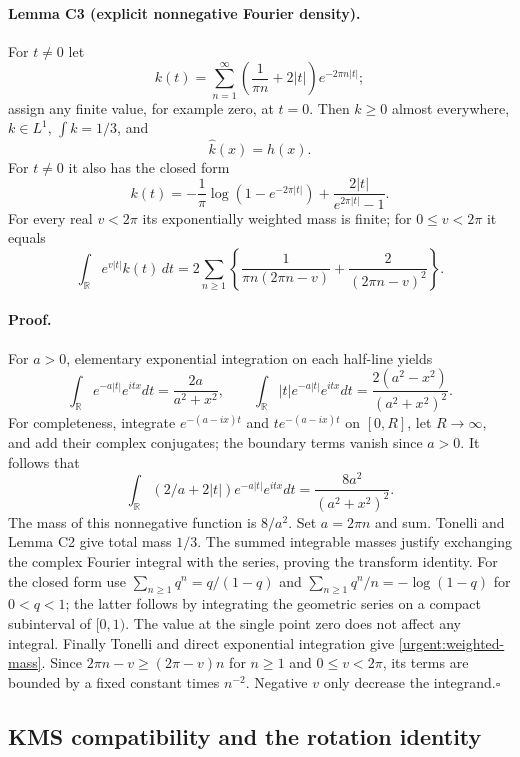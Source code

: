 \paragraph{Lemma C3 (explicit nonnegative Fourier density).}
For $t\ne0$ let
\[
 k(t)=\sum_{n=1}^\infty
       \left(\frac1{\pi n}+2|t|\right)e^{-2\pi n|t|};
\]
assign any finite value, for example zero, at $t=0$. Then $k\geq0$
almost everywhere, $k\in L^1$, $\int k=1/3$, and
\[
 \widehat k(x)=h(x).
\]
For $t\ne0$ it also has the closed form
\[
 k(t)=-\frac1\pi\log(1-e^{-2\pi|t|})
              +\frac{2|t|}{e^{2\pi|t|}-1}.
\]
For every real $v<2\pi$ its exponentially weighted mass is finite;
for $0\leq v<2\pi$ it equals
\begin{equation}
 \int_{\mathbb R}e^{v|t|}k(t)\,dt
 =2\sum_{n\geq1}\left\{
 \frac1{\pi n(2\pi n-v)}+
 \frac2{(2\pi n-v)^2}\right\}.
 \label{urgent:weighted-mass}
\end{equation}

\paragraph{Proof.}
For $a>0$, elementary exponential integration on each half-line yields
\[
 \int_{\mathbb R}e^{-a|t|}e^{itx}dt=\frac{2a}{a^2+x^2},
\qquad
 \int_{\mathbb R}|t|e^{-a|t|}e^{itx}dt
       =\frac{2(a^2-x^2)}{(a^2+x^2)^2}.
\]
For completeness, integrate $e^{-(a-ix)t}$ and $t e^{-(a-ix)t}$
on $[0,R]$, let $R\to\infty$, and add their complex conjugates;
the boundary terms vanish since $a>0$. It follows that
\[
 \int_{\mathbb R}(2/a+2|t|)e^{-a|t|}e^{itx}dt
     =\frac{8a^2}{(a^2+x^2)^2}.
\]
The mass of this nonnegative function is $8/a^2$.
Set $a=2\pi n$ and sum. Tonelli and Lemma C2 give total mass $1/3$.
The summed integrable masses justify exchanging the complex Fourier
integral with the series, proving the transform identity.
For the closed form use $\sum_{n\geq1}q^n=q/(1-q)$ and
$\sum_{n\geq1}q^n/n=-\log(1-q)$ for $0<q<1$; the latter follows
by integrating the geometric series on a compact subinterval of $[0,1)$.
The value at the single point zero does not affect any integral.
Finally Tonelli and direct exponential integration give
\eqref{urgent:weighted-mass}. Since
$2\pi n-v\geq(2\pi-v)n$ for $n\geq1$ and $0\leq v<2\pi$,
its terms are bounded by a fixed constant times $n^{-2}$.
Negative $v$ only decrease the integrand.\hfill$\square$

\subsection{KMS compatibility and the rotation identity}

